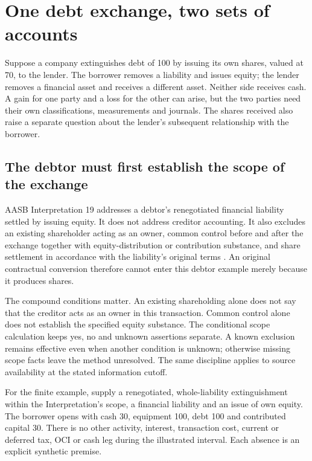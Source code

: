\section{One debt exchange, two sets of accounts}
\label{sec:worked-debt-exchange}

Suppose a company extinguishes debt of 100 by issuing its own shares, valued
at 70, to the lender. The borrower removes a liability and issues equity;
the lender removes a financial asset and receives a different asset. Neither
side receives cash. A gain for one party and a loss for the other can arise,
but the two parties need their own classifications, measurements and journals.
The shares received also raise a separate question about the lender's subsequent
relationship with the borrower.

\subsection{The debtor must first establish the scope of the exchange}

AASB Interpretation 19 addresses a debtor's renegotiated financial liability
settled by issuing equity. It does not address creditor accounting. It also
excludes an existing shareholder acting as an owner, common control before and
after the exchange together with equity-distribution or contribution substance,
and share settlement in accordance with the liability's original terms
\citep[paras.~2--3]{aasbint19exchange2020}. An original contractual conversion
therefore cannot enter this debtor example merely because it produces shares.

The compound conditions matter. An existing shareholding alone does not say
that the creditor acts as an owner in this transaction. Common control alone
does not establish the specified equity substance. The conditional scope
calculation keeps yes, no and unknown assertions separate. A known exclusion
remains effective even when another condition is unknown; otherwise missing
scope facts leave the method unresolved. The same discipline applies to
source availability at the stated information cutoff.

For the finite example, supply a renegotiated, whole-liability extinguishment
within the Interpretation's scope, a financial liability and an issue of own
equity. The borrower opens with cash 30, equipment 100, debt 100 and contributed
capital 30. There is no other activity, interest, transaction cost, current or
deferred tax, OCI or cash leg during the illustrated interval. Each absence is
an explicit synthetic premise.

